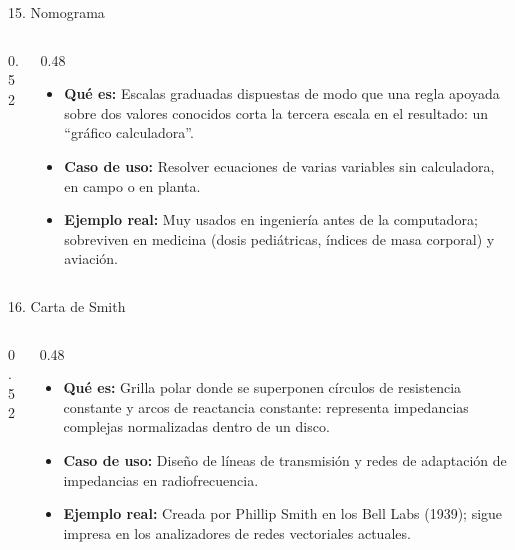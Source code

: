 \documentclass[aspectratio=169,9pt]{beamer}
\newcommand{\ficha}[3]{%
\begin{itemize}
\item \textbf{Qué es:} #1
\item \textbf{Caso de uso:} #2
\item \textbf{Ejemplo real:} #3
\end{itemize}}
\begin{document}
\begin{frame}{15. Nomograma}
\begin{columns}[T]
\begin{column}{0.52\textwidth}
\centering
{}
\end{column}
\begin{column}{0.48\textwidth}
\ficha{Escalas graduadas dispuestas de modo que una regla apoyada sobre dos valores conocidos corta la tercera escala en el resultado: un ``gráfico calculadora''.}
{Resolver ecuaciones de varias variables sin calculadora, en campo o en planta.}
{Muy usados en ingeniería antes de la computadora; sobreviven en medicina (dosis pediátricas, índices de masa corporal) y aviación.}
\end{column}
\end{columns}
\end{frame}

\begin{frame}{16. Carta de Smith}
\begin{columns}[T]
\begin{column}{0.52\textwidth}
\centering
{}
\end{column}
\begin{column}{0.48\textwidth}
\ficha{Grilla polar donde se superponen círculos de resistencia constante y arcos de reactancia constante: representa impedancias complejas normalizadas dentro de un disco.}
{Diseño de líneas de transmisión y redes de adaptación de impedancias en radiofrecuencia.}
{Creada por Phillip Smith en los Bell Labs (1939); sigue impresa en los analizadores de redes vectoriales actuales.}
\end{column}
\end{columns}
\end{frame}
\end{document}
